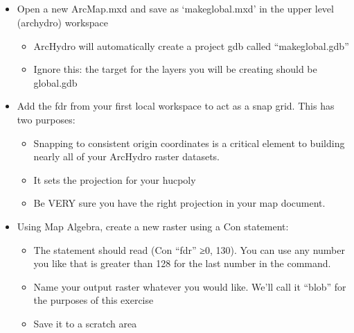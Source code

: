 \documentclass[letterpaper,10pt,english]{sphinxmanual}
\begin{document}
\subparagraph{}
\label{\detokenize{ex_2:blob-method-preferred}}\begin{itemize}
\item {} 
Open a new ArcMap.mxd and save as ‘makeglobal.mxd’ in the upper level (archydro) workspace
\begin{itemize}
\item {} 
ArcHydro will automatically create a project gdb called “makeglobal.gdb”

\item {} 
Ignore this: the target for the layers you will be creating should be global.gdb

\end{itemize}

\item {} 
Add the fdr from your first local workspace to act as a snap grid. This has two purposes:
\begin{itemize}
\item {} 
Snapping to consistent origin coordinates is a critical element to building nearly all of your ArcHydro raster datasets.

\item {} 
It sets the projection for your hucpoly

\item {} 
Be VERY sure you have the right projection in your map document.

\end{itemize}

\item {} 
Using Map Algebra, create a new raster using a Con statement:
\begin{itemize}
\item {} 
The statement should read (Con “fdr” ≥0, 130). You can use any number you like that is greater than 128 for the last number in the command.

\item {} 
Name your output raster whatever you would like. We’ll call it “blob” for the purposes of this exercise

\item {} 
Save it to a scratch area

\end{itemize}

\end{itemize}
\end{document}
